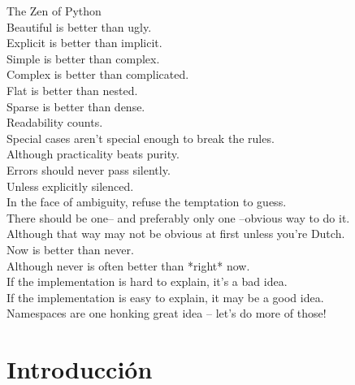 \documentclass[12pt]{article} %
\begin{document}
\tableofcontents %

\newpage %


\large The Zen of Python\\
\small{Beautiful is better than ugly.\\
    Explicit is better than implicit.\\
    Simple is better than complex.\\
    Complex is better than complicated.\\
    Flat is better than nested.\\
    Sparse is better than dense.\\
    Readability counts.\\
    Special cases aren't special enough to break the rules.\\
    Although practicality beats purity.\\
    Errors should never pass silently.\\
    Unless explicitly silenced.\\
    In the face of ambiguity, refuse the temptation to guess.\\
    There should be one-- and preferably only one --obvious way to do it.\\
    Although that way may not be obvious at first unless you're Dutch.\\
    Now is better than never.\\
    Although never is often better than *right* now.\\
    If the implementation is hard to explain, it's a bad idea.\\
    If the implementation is easy to explain, it may be a good idea.\\
    Namespaces are one honking great idea -- let's do more of those!\\} 

\section{Introducción} %
\end{document}
